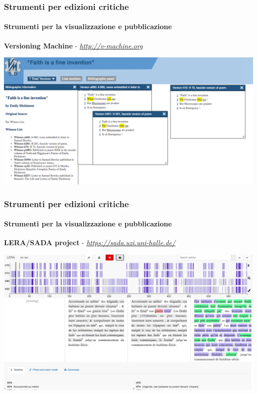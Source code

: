 \begin{frame}
    \frametitle{Strumenti per edizioni critiche}
    \framesubtitle{Strumenti per la visualizzazione e pubblicazione}
	\addtocounter{nframe}{1}
    \begin{center}
        \textbf{Versioning Machine} - \textit{\url{http://v-machine.org}}
    \end{center}
    \begin{center}
        \includegraphics[width=.95\textwidth]{imgs/v-machine.png}
	\end{center}
\end{frame}

\begin{frame}
    \frametitle{Strumenti per edizioni critiche}
    \framesubtitle{Strumenti per la visualizzazione e pubblicazione}
	\addtocounter{nframe}{1}
    \begin{center}
        \textbf{LERA/SADA project} - \textit{\url{https://sada.uzi.uni-halle.de/}}
    \end{center}
    \begin{center}
        \includegraphics[width=.95\textwidth]{imgs/lara.png}
	\end{center}
\end{frame}


